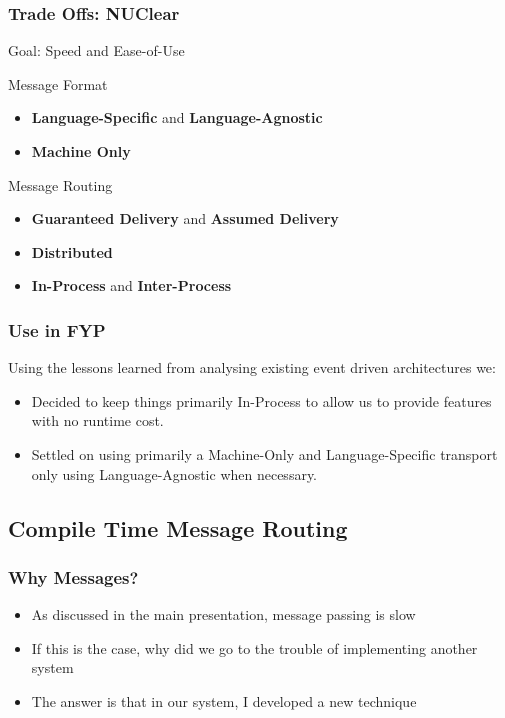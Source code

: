 \documentclass{beamer}
\begin{document}
	\begin{frame}
		\frametitle{Trade Offs: NUClear}

		Goal: Speed and Ease-of-Use

		Message Format
		\begin{itemize}
			\item \textbf{Language-Specific} and \textbf{Language-Agnostic}
			\item \textbf{Machine Only}
		\end{itemize}

		Message Routing
		\begin{itemize}
			\item \textbf{Guaranteed Delivery} and \textbf{Assumed Delivery}
			\item \textbf{Distributed}
			\item \textbf{In-Process} and \textbf{Inter-Process}
		\end{itemize}
	\end{frame}

	\begin{frame}
		\frametitle{Use in FYP}

		Using the lessons learned from analysing existing event driven architectures we:
		\begin{itemize}
			\item Decided to keep things primarily In-Process to allow us to provide features with no runtime cost.
			\item Settled on using primarily a Machine-Only and Language-Specific transport only using Language-Agnostic when necessary.
		\end{itemize}
	\end{frame}

	\subsection{Compile Time Message Routing}
	\begin{frame}
		\subsectionpage
	\end{frame}

	\begin{frame}
		\frametitle{Why Messages?}
		\begin{itemize}
			\item As discussed in the main presentation, message passing is slow
			\item If this is the case, why did we go to the trouble of implementing another system
			\item The answer is that in our system, I developed a new technique
		\end{itemize}
	\end{frame}
\end{document}
